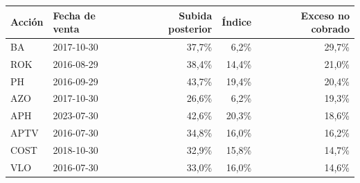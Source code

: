 \begin{tabular}{llrrr}
\toprule
Acción & Fecha de venta & Subida posterior & Índice & Exceso no cobrado \\
\midrule
BA & 2017-10-30 & 37,7\% & 6,2\% & 29,7\% \\
ROK & 2016-08-29 & 38,4\% & 14,4\% & 21,0\% \\
PH & 2016-09-29 & 43,7\% & 19,4\% & 20,4\% \\
AZO & 2017-10-30 & 26,6\% & 6,2\% & 19,3\% \\
APH & 2023-07-30 & 42,6\% & 20,3\% & 18,6\% \\
APTV & 2016-07-30 & 34,8\% & 16,0\% & 16,2\% \\
COST & 2018-10-30 & 32,9\% & 15,8\% & 14,7\% \\
VLO & 2016-07-30 & 33,0\% & 16,0\% & 14,6\% \\
\bottomrule
\end{tabular}

